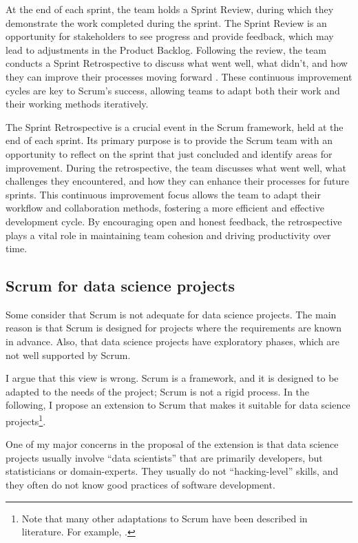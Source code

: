At the end of each sprint, the team holds a Sprint Review, during which they demonstrate
the work completed during the sprint. The Sprint Review is an opportunity for stakeholders
to see progress and provide feedback, which may lead to adjustments in the Product
Backlog. Following the review, the team conducts a Sprint Retrospective to discuss what
went well, what didn't, and how they can improve their processes moving forward
\parencite{rubin2012sprints}. These continuous improvement cycles are key to Scrum's success,
allowing teams to adapt both their work and their working methods iteratively.

The Sprint Retrospective is a crucial event in the Scrum framework, held at the end of
each sprint. Its primary purpose is to provide the Scrum team with an opportunity to
reflect on the sprint that just concluded and identify areas for improvement. During the
retrospective, the team discusses what went well, what challenges they encountered, and
how they can enhance their processes for future sprints. This continuous improvement focus
allows the team to adapt their workflow and collaboration methods, fostering a more
efficient and effective development cycle. By encouraging open and honest feedback, the
retrospective plays a vital role in maintaining team cohesion and driving productivity
over time.

\subsection{Scrum for data science projects}

Some consider that Scrum is not adequate for data science projects.  The main reason is
that Scrum is designed for projects where the requirements are known in advance.  Also,
that data science projects have exploratory phases, which are not well supported by Scrum.

I argue that this view is wrong.  Scrum is a framework, and it is designed to be adapted to
the needs of the project;  Scrum is not a rigid process.  In the following, I propose an
extension to Scrum that makes it suitable for data science projects\footnote{Note that
many other adaptations to Scrum have been described in literature.  For example,
.}.

One of my major concerns in the proposal of the extension is that data science projects
usually involve ``data scientists'' that are primarily developers, but statisticians or
domain-experts.  They usually do not ``hacking-level'' skills, and they often do not know
good practices of software development.

